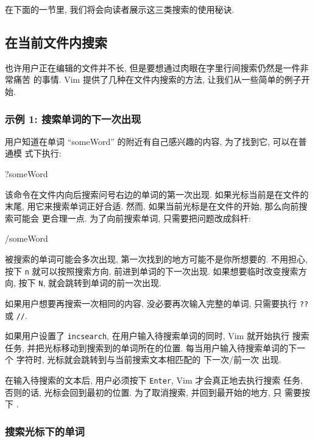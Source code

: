 在下面的一节里, 我们将会向读者展示这三类搜索的使用秘诀.

\subsection{在当前文件内搜索}
\label{subsec:search_the_current_file}

也许用户正在编辑的文件并不长, 但是要想通过肉眼在字里行间搜索仍然是一件非常痛苦
的事情. Vim 提供了几种在文件内搜索的方法, 让我们从一些简单的例子开始.

\subsubsection{示例 1: 搜索单词的下一次出现}
\label{subsubsec:example_1_find_the_next_occurrence_of_a_word}

用户知道在单词 ``someWord'' 的附近有自己感兴趣的内容, 为了找到它, 可以在普通模
式下执行:
\begin{vimcmd}
?someWord
\end{vimcmd}
该命令在文件内向后搜索问号右边的单词的第一次出现. 如果光标当前是在文件的末尾,
用它来搜索单词正好合适. 然而, 如果当前光标是在文件的开始, 那么向前搜索可能会
更合理一点. 为了向前搜索单词, 只需要把问题改成斜杆:
\begin{vimcmd}
/someWord
\end{vimcmd}
被搜索的单词可能会多次出现, 第一次找到的地方可能不是你所想要的. 不用担心, 按下 
\texttt{n} 就可以按照搜索方向, 前进到单词的下一次出现. 如果想要临时改变搜索方向,
按下 \texttt{N}, 就会跳转到单词的前一次出现.

如果用户想要再搜索一次相同的内容, 没必要再次输入完整的单词, 只需要执行
\texttt{??} 或 \texttt{//}.

如果用户设置了 \texttt{incsearch}, 在用户输入待搜索单词的同时, Vim 就开始执行
搜索任务, 并把光标移动到搜索到的单词所在的位置. 每当用户输入待搜索单词的下一个
字符时, 光标就会跳转到与当前搜索文本相匹配的 下一次/前一次 出现.

\begin{warning}
    在输入待搜索的文本后, 用户必须按下 \texttt{Enter}, Vim 才会真正地去执行搜索
    任务, 否则的话, 光标会回到最初的位置. 为了取消搜索, 并回到最开始的地方, 只
    需要按下 .
\end{warning}

\subsubsection{搜索光标下的单词}
\label{subsubsec:search_for_a_word_under_the_cursor}

